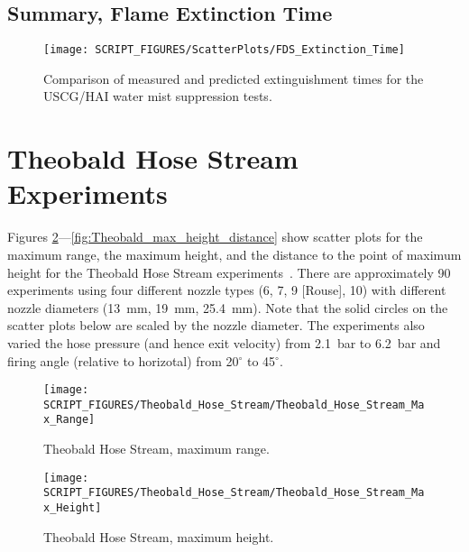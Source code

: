 \clearpage

\subsection{Summary, Flame Extinction Time}
\label{Extinction Time}

\begin{figure}[h!]
\begin{center}
\texttt{[image: SCRIPT\_FIGURES/ScatterPlots/FDS\_Extinction\_Time]}
\caption[Extinguishment times for the USCG/HAI water mist suppression tests]{Comparison of measured and predicted extinguishment times for the USCG/HAI water mist suppression tests.}
\label{USCG_Scatter}
\end{center}
\end{figure}

\clearpage

\section{Theobald Hose Stream Experiments}

Figures \ref{fig:Theobald_max_range}---\ref{fig:Theobald_max_height_distance} show scatter plots for the maximum range, the maximum height, and the distance to the point of maximum height for the Theobald Hose Stream experiments~\cite{Theobald:1981}.  There are approximately 90 experiments using four different nozzle types (6, 7, 9 [Rouse], 10) with different nozzle diameters (13~mm, 19~mm, 25.4~mm).  Note that the solid circles on the scatter plots below are scaled by the nozzle diameter.  The experiments also varied the hose pressure (and hence exit velocity) from 2.1~bar to 6.2~bar and firing angle (relative to horizotal) from 20$^\circ$ to 45$^\circ$.

\begin{figure}[h!]
\begin{center}
\texttt{[image: SCRIPT\_FIGURES/Theobald\_Hose\_Stream/Theobald\_Hose\_Stream\_Max\_Range]}
\caption[Theobald Hose Stream max range]{Theobald Hose Stream, maximum range.}
\label{fig:Theobald_max_range}
\end{center}
\end{figure}

\begin{figure}[!ht]
\begin{center}
\texttt{[image: SCRIPT\_FIGURES/Theobald\_Hose\_Stream/Theobald\_Hose\_Stream\_Max\_Height]}
\caption[Theobald Hose Stream max height]{Theobald Hose Stream, maximum height.}
\label{fig:Theobald_max_height}
\end{center}
\end{figure}

